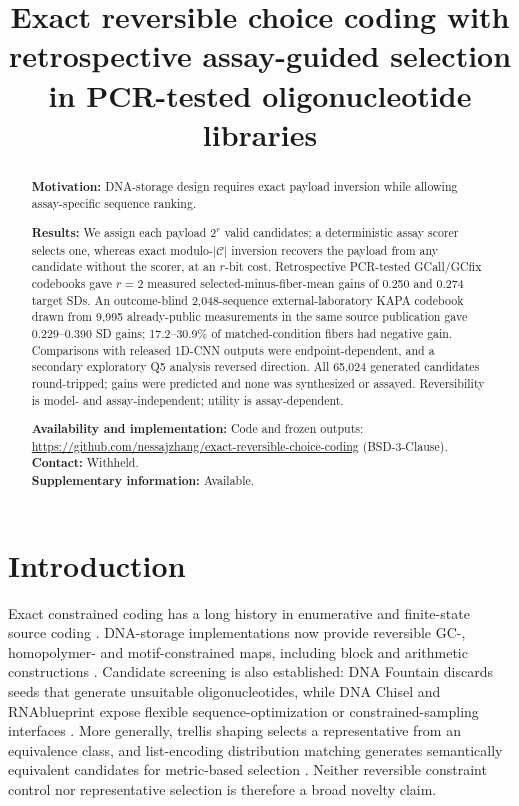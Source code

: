 \documentclass[10pt]{article}
\title{Exact reversible choice coding with retrospective assay-guided selection in PCR-tested oligonucleotide libraries}
\author{}
\date{}
\begin{document}
\maketitle

\begin{abstract}
\noindent\textbf{Motivation:} DNA-storage design requires exact payload inversion while allowing assay-specific sequence ranking.

\noindent\textbf{Results:} We assign each payload $2^r$ valid candidates; a deterministic assay scorer selects one, whereas exact modulo-$|\mathcal C|$ inversion recovers the payload from any candidate without the scorer, at an $r$-bit cost. Retrospective PCR-tested GCall/GCfix codebooks gave $r=2$ measured selected-minus-fiber-mean gains of 0.250 and 0.274 target SDs. An outcome-blind 2,048-sequence external-laboratory KAPA codebook drawn from 9,995 already-public measurements in the same source publication gave 0.229--0.390 SD gains; 17.2--30.9\% of matched-condition fibers had negative gain. Comparisons with released 1D-CNN outputs were endpoint-dependent, and a secondary exploratory Q5 analysis reversed direction. All 65,024 generated candidates round-tripped; gains were predicted and none was synthesized or assayed. Reversibility is model- and assay-independent; utility is assay-dependent.

\noindent\textbf{Availability and implementation:} Code and frozen outputs: \url{https://github.com/nessajzhang/exact-reversible-choice-coding} (BSD-3-Clause).\\
\textbf{Contact:} Withheld.\\
\textbf{Supplementary information:} Available.
\end{abstract}

\section{Introduction}

Exact constrained coding has a long history in enumerative and finite-state source coding \cite{cover1973enumerative,adler1983slidingblock}. DNA-storage implementations now provide reversible GC-, homopolymer- and motif-constrained maps, including block and arithmetic constructions \cite{wang2019bioconstrained,immink2019balancedhomopolymer,welzel2023dnaaeon,ruan2026scone}. Candidate screening is also established: DNA Fountain discards seeds that generate unsuitable oligonucleotides, while DNA Chisel and RNAblueprint expose flexible sequence-optimization or constrained-sampling interfaces \cite{erlich2017dnafountain,zulkower2020dnachisel,hammer2017rnablueprint}. More generally, trellis shaping selects a representative from an equivalence class, and list-encoding distribution matching generates semantically equivalent candidates for metric-based selection \cite{forney1992trellisshaping,wu2022listccdm}. Neither reversible constraint control nor representative selection is therefore a broad novelty claim.
\end{document}
